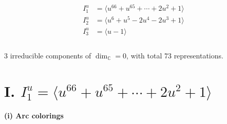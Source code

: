 \documentclass[1p]{elsarticle_modified}
\theoremstyle{definition}
\begin{document}
\begin{align*}
I^u_{1}&=\langle 
u^{66}+u^{65}+\cdots+2 u^2+1\rangle \\
I^u_{2}&=\langle 
u^6+u^5-2 u^4-2 u^3+1\rangle \\
I^u_{3}&=\langle 
u-1\rangle \\
\\
\end{align*}
\raggedright * 3 irreducible components of $\dim_{\mathbb{C}}=0$, with total 73 representations.\\
\newpage
\renewcommand{\arraystretch}{1}
\centering \section*{I. $I^u_{1}= \langle u^{66}+u^{65}+\cdots+2 u^2+1 \rangle$}
\flushleft \textbf{(i) Arc colorings}\\
\end{document}
